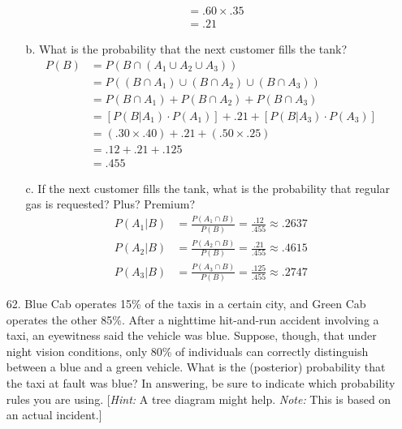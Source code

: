 \documentclass[letterpaper,12pt]{article}
\begin{document}
\begin{enumerate}
\begin{enumerate}
\begin{align*}
          &= .60 \times .35 \\
          &= .21
        \end{align*}
      \item[b.]
        What is the probability that the next customer fills the tank?
        \begin{align*}
          P(B) &= P(B \cap (A_1 \cup A_2 \cup A_3)) \\
          &= P((B \cap A_1) \cup (B \cap A_2) \cup (B \cap A_3)) \\
          &= P(B \cap A_1) + P(B \cap A_2) + P(B \cap A_3) \\
          &= [P(B|A_1) \cdot P(A_1)] + .21 + [P(B|A_3) \cdot P(A_3)] \\
          &= (.30 \times .40) + .21 + (.50 \times .25) \\
          &= .12 + .21 + .125 \\
          & = .455
        \end{align*}
      \item[c.]
        If the next customer fills the tank, what is the probability that regular gas is requested? Plus? Premium?
        \begin{align*}
          P(A_1|B) &= \frac{P(A_1 \cap B)}{P(B)} = \frac{.12}{.455} \approx .2637 \\
          P(A_2|B) &= \frac{P(A_2 \cap B)}{P(B)} = \frac{.21}{.455} \approx .4615 \\
          P(A_3|B) &= \frac{P(A_3 \cap B)}{P(B)} = \frac{.125}{.455} \approx .2747
        \end{align*}
    \end{enumerate}
  \item[62.]
    Blue Cab operates 15\% of the taxis in a certain city, and Green Cab operates the other 85\%. After a nighttime hit-and-run accident involving a taxi, an eyewitness said the vehicle was blue. Suppose, though, that under night vision conditions, only 80\% of individuals can correctly distinguish between a blue and a green vehicle. What is the (posterior) probability that the taxi at fault was blue? In answering, be sure to indicate which probability rules you are using. [\textit{Hint:} A tree diagram might help. \textit{Note:} This is based on an actual incident.]
\end{enumerate}
\end{document}
